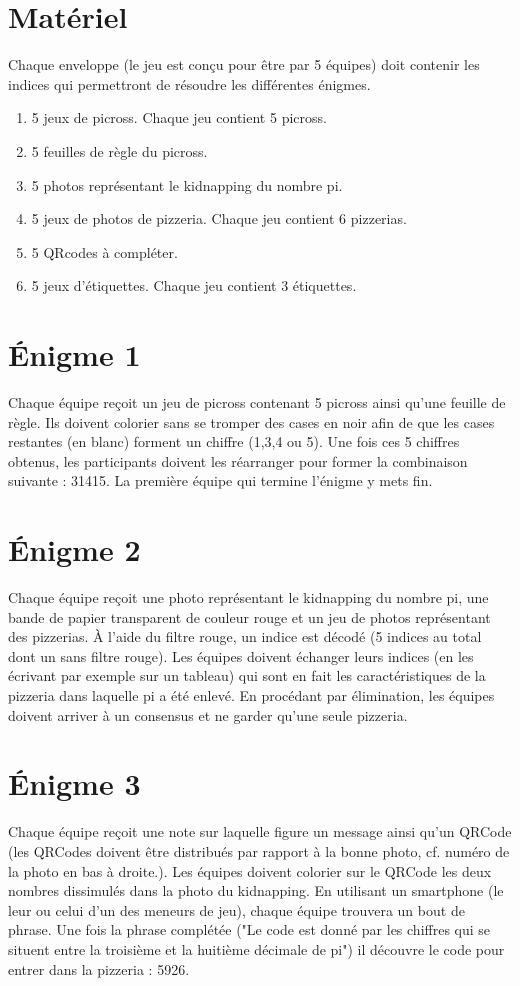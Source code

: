 \documentclass[parskip=half-]{scrartcl}
\begin{document}
\section*{Matériel}
Chaque enveloppe (le jeu est conçu pour être par 5 équipes) doit contenir les indices qui permettront de résoudre les différentes énigmes.
\begin{enumerate}
    \item 5 jeux de picross. Chaque jeu contient 5 picross.
    \item 5 feuilles de règle du picross.
    \item 5 photos représentant le kidnapping du nombre pi. 
    \item 5 jeux de photos de pizzeria. Chaque jeu contient 6 pizzerias.
    \item 5 QRcodes à compléter.
    \item 5 jeux d'étiquettes. Chaque jeu contient 3 étiquettes.
\end{enumerate}

\section*{Énigme 1}
Chaque équipe reçoit un jeu de picross contenant 5 picross ainsi qu'une feuille de règle. Ils doivent colorier sans se tromper des cases en noir afin de que les cases restantes (en blanc) forment un chiffre (1,3,4 ou 5). Une fois ces 5 chiffres obtenus, les participants doivent les réarranger pour former la combinaison suivante : 31415. La première équipe qui termine l'énigme y mets fin.

\section*{Énigme 2}
Chaque équipe reçoit une photo représentant le kidnapping du nombre pi, une bande de papier transparent de couleur rouge et un jeu de photos représentant des pizzerias.
À l'aide du filtre rouge, un indice est décodé (5 indices au total dont un sans filtre rouge). Les équipes doivent échanger leurs indices (en les écrivant par exemple sur un tableau) qui sont en fait les caractéristiques de la pizzeria dans laquelle pi a été enlevé. En procédant par élimination, les équipes doivent arriver à un consensus et ne garder qu'une seule pizzeria.

\section*{Énigme 3}
Chaque équipe reçoit une note sur laquelle figure un message ainsi qu'un QRCode (les QRCodes doivent être distribués par rapport à la bonne photo, cf. numéro de la photo en bas à droite.). Les équipes doivent colorier sur le QRCode les deux nombres dissimulés dans la photo du kidnapping. En utilisant un smartphone (le leur ou celui d'un des meneurs de jeu), chaque équipe trouvera un bout de phrase. Une fois la phrase complétée ("Le code est donné par les chiffres qui se situent entre la troisième et la huitième décimale de pi") il découvre le code pour entrer dans la pizzeria : 5926.
\end{document}
